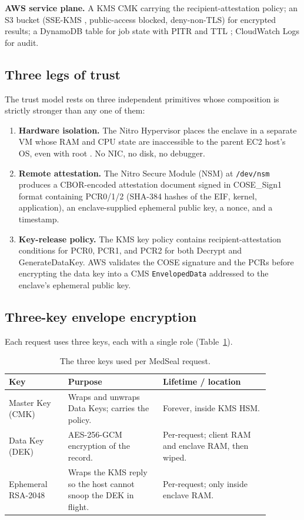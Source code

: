 \documentclass[11pt]{article}
\begin{document}
\textbf{AWS service plane.} A KMS CMK \cite{kmsguide} carrying the
recipient-attestation policy; an S3 bucket
(SSE-KMS \cite{s3ssekms}, public-access blocked, deny-non-TLS) for
encrypted results; a DynamoDB table for job state with PITR and TTL
\cite{ddb}; CloudWatch Logs for audit.

\subsection{Three legs of trust}

The trust model rests on three independent primitives whose
composition is strictly stronger than any one of them:

\begin{enumerate}\setlength{\itemsep}{1pt}
    \item \textbf{Hardware isolation.} The Nitro Hypervisor places
    the enclave in a separate VM whose RAM and CPU state are
    inaccessible to the parent EC2 host's OS, even with root
    \cite{nitrosystem}. No NIC, no disk, no debugger.
    \item \textbf{Remote attestation.} The Nitro Secure Module (NSM)
    at \texttt{/dev/nsm} produces a CBOR-encoded \cite{rfc8949}
    attestation document signed in COSE\_Sign1 format
    \cite{rfc9052} containing PCR0/1/2 (SHA-384 hashes of the EIF,
    kernel, application), an enclave-supplied ephemeral public key,
    a nonce, and a timestamp.
    \item \textbf{Key-release policy.} The KMS key policy contains
    recipient-attestation conditions for PCR0, PCR1, and PCR2
    \cite{kmsattested,kmsenclaves} for both Decrypt and
    GenerateDataKey. AWS validates the COSE signature and the PCRs
    before encrypting the data key into a CMS \texttt{EnvelopedData}
    \cite{rfc5652} addressed to the enclave's ephemeral public key.
\end{enumerate}

\subsection{Three-key envelope encryption}\label{sec:keys}

Each request uses three keys, each with a single role
(Table~\ref{tab:keys}).

\begin{table}[t]
\small
\setlength{\tabcolsep}{4pt}
\begin{tabular}{p{0.20\linewidth} p{0.32\linewidth} p{0.36\linewidth}}
\toprule
\textbf{Key} & \textbf{Purpose} & \textbf{Lifetime / location} \\
\midrule
Master Key (CMK) & Wraps and unwraps Data Keys; carries the policy. & Forever, inside KMS HSM. \\
Data Key (DEK) & AES-256-GCM encryption of the record. & Per-request; client RAM and enclave RAM, then wiped. \\
Ephemeral RSA-2048 & Wraps the KMS reply so the host cannot snoop the DEK in flight. & Per-request; only inside enclave RAM. \\
\bottomrule
\end{tabular}
\caption{The three keys used per MedSeal request.}
\label{tab:keys}
\end{table}
\end{document}
